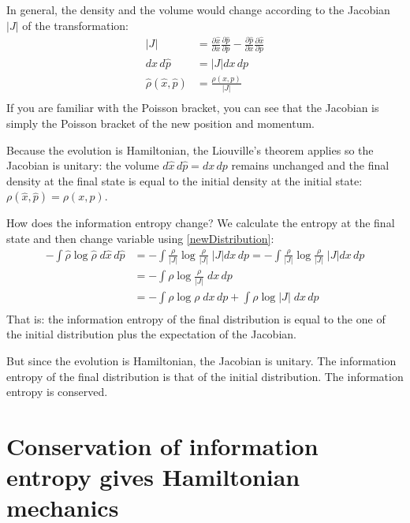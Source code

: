 \documentclass[aps,pra,10pt,floatfix,nofootinbib]{revtex4-1}
\theoremstyle{definition}
\begin{document}
In general, the density and the volume would change according to the Jacobian $|J|$ of the transformation:
\begin{equation}
\begin{aligned}
|J| &= \frac{\partial \hat{x}}{\partial x} \frac{\partial \hat{p}}{\partial p} - \frac{\partial \hat{p}}{\partial x} \frac{\partial \hat{x}}{\partial p}\\
d\hat{x}\,d\hat{p} &= |J| dx \,dp  \\
\hat{\rho}(\hat{x}, \hat{p}) &= \frac{\rho(x, p)}{|J|}  \\
\end{aligned}
\label{newDistribution}
\end{equation}
If you are familiar with the Poisson bracket, you can see that the Jacobian is simply the Poisson bracket of the new position and momentum.

Because the evolution is Hamiltonian, the Liouville's theorem applies so the Jacobian is unitary: the volume $d\hat{x}\,d\hat{p} = dx \,dp$ remains unchanged and the final density at the final state is equal to the initial density at the initial state: $\rho(\hat{x}, \hat{p}) = \rho(x, p)$.  

How does the information entropy change? We calculate the entropy at the final state and then change variable using \eqref{newDistribution}:
\begin{equation}
\begin{aligned}
-\int \hat{\rho} \log \hat{\rho} \; d\hat{x}\,d\hat{p}&= -\int \frac{\rho}{|J|} \log \frac{\rho}{|J|} \; |J| dx \,dp = -\int \frac{\rho}{|J|} \log \frac{\rho}{|J|} \; |J| dx \,dp \\
&= -\int \rho \log \frac{\rho}{|J|} \; dx \,dp \\
&= -\int \rho \log \rho \; dx \,dp + \int \rho \log |J| \; dx \,dp \\
\end{aligned}
\label{newEntropy}
\end{equation}
That is: the information entropy of the final distribution is equal to the one of the initial distribution plus the expectation of the Jacobian.

But since the evolution is Hamiltonian, the Jacobian is unitary. The information entropy of the final distribution is that of the initial distribution. The information entropy is conserved.

\section{Conservation of information entropy gives Hamiltonian mechanics}
\end{document}
